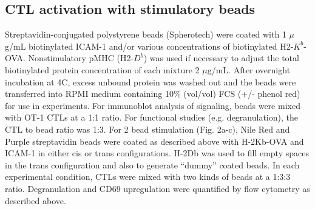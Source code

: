 \subsection{CTL activation with stimulatory beads}
Streptavidin-conjugated polystyrene beads (Spherotech) were coated with 1 $\mu$g/mL biotinylated ICAM-1 and/or various concentrations of biotinylated H2-$K^{b}$-OVA. Nonstimulatory pMHC (H2-$D^{b}$) was used if necessary to adjust the total biotinylated protein concentration of each mixture 2 $\mu$g/mL. After overnight incubation at 4\degree C, excess unbound protein was washed out and the beads were transferred into RPMI medium containing 10\% (vol/vol) FCS (+/- phenol red) for use in experiments. For immunoblot analysis of signaling, beads were mixed with OT-1 CTLs at a 1:1 ratio. For functional studies (e.g. degranulation), the CTL to bead ratio was 1:3. For 2 bead stimulation (Fig. 2a-c), Nile Red and Purple streptavidin beads were coated as described above with H-2Kb-OVA and ICAM-1 in either cis or trans configurations. H-2Db was used to fill empty spaces in the trans configuration and also to generate “dummy” coated beads. In each experimental condition, CTLs were mixed with two kinds of beads at a 1:3:3 ratio. Degranulation and CD69 upregulation were quantified by flow cytometry as described above. 

